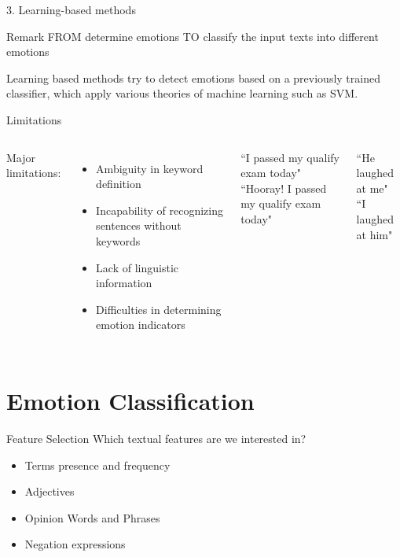 \documentclass[xcolor=dvipsnames]{beamer}
\begin{document}
\begin{frame}{3. Learning-based methods}
\begin{block}{Remark}
FROM determine emotions TO classify the input texts into different emotions
\end{block}
Learning based methods try to detect emotions based on a previously trained classifier, which apply various theories of machine learning such as SVM.
\end{frame}

\begin{frame}{Limitations}
\begin{columns}
Major limitations:
\begin{itemize}
\item Ambiguity in keyword definition
\item Incapability of recognizing sentences without keywords
\item Lack of linguistic information
\item Difficulties in determining emotion indicators
\end{itemize}
\begin{example}
``I passed my qualify exam today"\\
``Hooray! I passed my qualify exam today"
\end{example}
\begin{example}
``He laughed at me"\\
``I laughed at him"
\end{example}
\end{columns}
\end{frame}



\section{Emotion Classification}

\begin{frame}{Feature Selection}
Which textual features are we interested in?
\begin{itemize}
\item Terms presence and frequency
\item Adjectives
\item Opinion Words and Phrases
\item Negation expressions
\end{itemize}
\end{frame}
\end{document}
